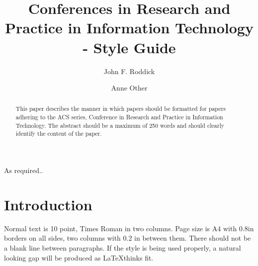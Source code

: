 \documentclass{CRPITStyle}
\begin{document}
\title{ Conferences in Research and Practice in Information Technology - Style Guide}
\author{John F. Roddick 
\and 
Anne Other}

\maketitle


\newcommand\conferencenameandplace{Twenty-Sixth Australasian Computer Science Conference (ACSC2003), Adelaide, Australia}
\newcommand\volumenumber{16}
\newcommand\conferenceyear{2003}
\newcommand\editorname{Michael Oudshoorn}
\toappearstandard 


\begin{abstract}
This paper describes the manner in which papers should be formatted for papers adhering to the ACS series, Conference in Research and Practice in Information Technology.  The abstract should be a maximum of 250 words and should clearly identify the content of the paper.  
\end{abstract}
\vspace{.1in}

 As required..

\section{Introduction}
Normal text is 10 point, Times Roman in two columns.  Page size is A4 with 0.8in borders on all sides, two columns with 0.2 in between them.  There should not be a blank line between paragraphs.  If the style is being used properly, a natural looking gap will be produced as \LaTeX thinks fit.
\end{document}
